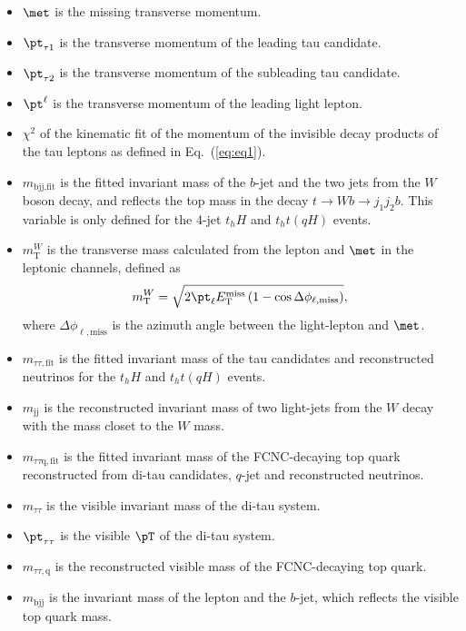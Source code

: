 \begin{itemize}
\item $\met$ is the missing transverse momentum.
\item ${\pt}_{\tau1} $ is the transverse momentum of the leading tau candidate.
\item ${\pt}_{\tau2}$ is the transverse momentum of the subleading tau candidate.
\item ${\pt}^{\ell}$ is the transverse momentum of the leading light lepton.
\item $\chi^2$ of the kinematic fit of the momentum of the invisible decay products of the tau leptons as defined in Eq.~(\ref{eq:eq1}).
\item $m_{\text{bjj},\text{fit}}$ is the fitted invariant mass of the $b$-jet and the two jets from the $W$ boson decay, and reflects the top mass in the decay $t\to Wb \to j_1j_2b$. This variable is only defined for the 4-jet $t_hH$ and $t_ht(qH)$ events.
\item $m^{W}_{\text{T}}$ is the transverse mass calculated from the lepton and $\met$ in the leptonic channels, defined as
\begin{equation}
m^{W}_{\text{T}} = \sqrt{2 {\pt}_{\ell} E_{\text{T}}^{\text{miss}} \left(1-\cos\Delta\phi_{\ell,\text{miss}} \right)},  
\end{equation}
where $\Delta\phi_{\ell,\text{miss}}$ is the azimuth angle between the light-lepton and $\met$.  
\item $m_{\tau\tau,\text{fit}}$ is the fitted invariant mass of the tau candidates and reconstructed neutrinos for the $t_hH$ and $t_ht(qH)$ events. 
\item $m_{\text{jj}}$ is the reconstructed invariant mass of two light-jets from the $W$ decay with the mass closet to the $W$ mass.
\item $m_{\tau\tau\text{q},\text{fit}}$ is the fitted invariant mass of the FCNC-decaying top quark reconstructed from di-tau candidates, $q$-jet and reconstructed neutrinos.
\item $m_{\tau\tau}$ is the visible invariant mass of the di-tau system. %
\item ${\pt}_{\tau\tau}$ is the visible $\pT$ of the di-tau system.
\item $m_{\tau\tau,\text{q}}$ is the reconstructed visible mass of the FCNC-decaying top quark.
\item $m_{\text{bjj}}$ is the invariant mass of the lepton and the $b$-jet, which reflects the visible top quark mass.

\end{itemize}
